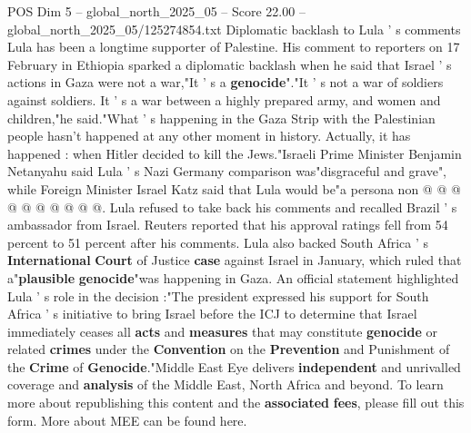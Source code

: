 \begin{textsample}{POS Dim 5 – global\_north\_2025\_05 – Score 22.00 – global\_north\_2025\_05/125274854.txt}
Diplomatic backlash to Lula ' s comments Lula has been a longtime supporter of Palestine.
His comment to reporters on 17 February in Ethiopia sparked a diplomatic backlash when he said that Israel ' s actions in Gaza were not a war,"It ' s a \textbf{genocide}"."It ' s not a war of soldiers against soldiers.
It ' s a war between a highly prepared army, and women and children,"he said."What ' s happening in the Gaza Strip with the Palestinian people hasn't happened at any other moment in history.
Actually, it has happened : when Hitler decided to kill the Jews."Israeli Prime Minister Benjamin Netanyahu said Lula ' s Nazi Germany comparison was"disgraceful and grave", while Foreign Minister Israel Katz said that Lula would be"a persona non @ @ @ @ @ @ @ @ @ @.
Lula refused to take back his comments and recalled Brazil ' s ambassador from Israel.
Reuters reported that his approval ratings fell from 54 percent to 51 percent after his comments.
Lula also backed South Africa ' s \textbf{International} \textbf{Court} of Justice \textbf{case} against Israel in January, which ruled that a"\textbf{plausible} \textbf{genocide}"was happening in Gaza.
An official statement highlighted Lula ' s role in the decision :"The president expressed his support for South Africa ' s initiative to bring Israel before the ICJ to determine that Israel immediately ceases all \textbf{acts} and \textbf{measures} that may constitute \textbf{genocide} or related \textbf{crimes} under the \textbf{Convention} on the \textbf{Prevention} and Punishment of the \textbf{Crime} of \textbf{Genocide}."Middle East Eye delivers \textbf{independent} and unrivalled coverage and \textbf{analysis} of the Middle East, North Africa and beyond.
To learn more about republishing this content and the \textbf{associated} \textbf{fees}, please fill out this form.
More about MEE can be found here.

\end{textsample}
